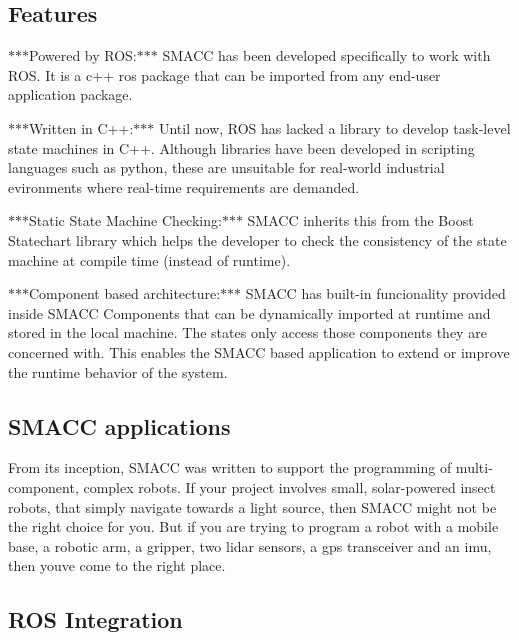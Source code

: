 \subsection*{Features}


\begin{DoxyItemize}
\item $\ast$$\ast$$\ast$\+Powered by R\+OS\+:$\ast$$\ast$$\ast$ S\+M\+A\+CC has been developed specifically to work with R\+OS. It is a c++ ros package that can be imported from any end-\/user application package.
\item $\ast$$\ast$$\ast$\+Written in C++\+:$\ast$$\ast$$\ast$ Until now, R\+OS has lacked a library to develop task-\/level state machines in C++. Although libraries have been developed in scripting languages such as python, these are unsuitable for real-\/world industrial evironments where real-\/time requirements are demanded.
\item $\ast$$\ast$$\ast$\+Static State Machine Checking\+:$\ast$$\ast$$\ast$ S\+M\+A\+CC inherits this from the Boost Statechart library which helps the developer to check the consistency of the state machine at compile time (instead of runtime).
\item $\ast$$\ast$$\ast$\+Component based architecture\+:$\ast$$\ast$$\ast$ S\+M\+A\+CC has built-\/in funcionality provided inside S\+M\+A\+CC Components that can be dynamically imported at runtime and stored in the local machine. The states only access those components they are concerned with. This enables the S\+M\+A\+CC based application to extend or improve the runtime behavior of the system.
\end{DoxyItemize}

\subsection*{S\+M\+A\+CC applications}

From it\textquotesingle{}s inception, S\+M\+A\+CC was written to support the programming of multi-\/component, complex robots. If your project involves small, solar-\/powered insect robots, that simply navigate towards a light source, then S\+M\+A\+CC might not be the right choice for you. But if you are trying to program a robot with a mobile base, a robotic arm, a gripper, two lidar sensors, a gps transceiver and an imu, then you\textquotesingle{}ve come to the right place.

\subsection*{R\+OS Integration}


